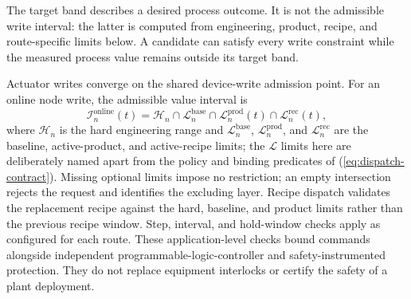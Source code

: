 The target band describes a desired process outcome. It is not the admissible
write interval: the latter is computed from engineering, product, recipe, and
route-specific limits below. A candidate can satisfy every write constraint
while the measured process value remains outside its target band.

Actuator writes converge on the shared device-write admission point.
For an online node write, the admissible value interval is
\begin{equation}
\mathcal{I}^{\mathrm{online}}_n(t)=
\mathcal{H}_n\cap\mathcal{L}^{\mathrm{base}}_n\cap\mathcal{L}^{\mathrm{prod}}_n(t)\cap\mathcal{L}^{\mathrm{rec}}_n(t),
\label{eq:admission}
\end{equation}
where $\mathcal{H}_n$ is the hard engineering range and
$\mathcal{L}^{\mathrm{base}}_n$, $\mathcal{L}^{\mathrm{prod}}_n$, and
$\mathcal{L}^{\mathrm{rec}}_n$ are the baseline, active-product, and
active-recipe limits; the $\mathcal{L}$ limits here are deliberately named
apart from the policy and binding predicates of
(\ref{eq:dispatch-contract}). Missing optional limits impose no
restriction; an empty intersection rejects the request and identifies the
excluding layer. Recipe dispatch validates the replacement recipe against
the hard, baseline, and product limits rather than the previous recipe
window. Step, interval, and hold-window checks apply as configured for each route.
These application-level checks bound commands alongside independent
programmable-logic-controller and safety-instrumented protection. They do not
replace equipment interlocks or certify the safety of a plant deployment.


